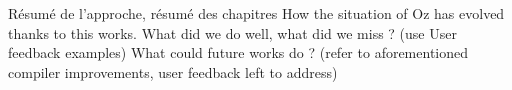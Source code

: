 
Résumé de l'approche, résumé des chapitres
How the situation of Oz has evolved thanks to this works.\newline
What did we do well, what did we miss ? (use User feedback examples)\newline
What could future works do ? (refer to aforementioned compiler improvements, user feedback left to address)